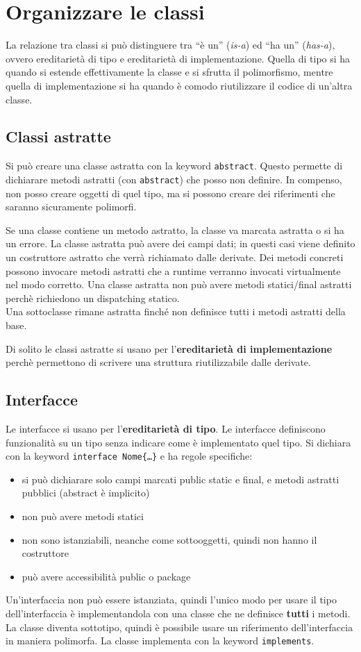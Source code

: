 \chapter{Organizzare le classi}

La relazione tra classi si può distinguere tra “è un” (\textit{is-a}) ed “ha un” (\textit{has-a}), ovvero ereditarietà di tipo e ereditarietà di implementazione. Quella di tipo si ha quando si estende effettivamente la classe e si sfrutta il polimorfismo, mentre quella di implementazione si ha quando è comodo riutilizzare il codice di un'altra classe.
\section{Classi astratte}
Si può creare una classe astratta con la keyword \texttt{abstract}. Questo permette di dichiarare metodi astratti (con \texttt{abstract}) che posso non definire. In compenso, non posso creare oggetti di quel tipo, ma si possono creare dei riferimenti che saranno sicuramente polimorfi.

Se una classe contiene un metodo astratto, la classe va marcata astratta o si ha un errore.
La classe astratta può avere dei campi dati; in questi casi viene definito un costruttore astratto che verrà richiamato dalle derivate.
Dei metodi concreti possono invocare metodi astratti che a runtime verranno invocati virtualmente nel modo corretto.
Una classe astratta non può avere metodi statici/final astratti perchè richiedono un dispatching statico. \\
Una sottoclasse rimane astratta finché non definisce tutti i metodi astratti della base.

Di solito le classi astratte si usano per l'\textbf{ereditarietà di implementazione} perchè permettono di scrivere una struttura riutilizzabile dalle derivate.

\section{Interfacce}
Le interfacce si usano per l'\textbf{ereditarietà di tipo}. Le interfacce definiscono funzionalità su un tipo senza indicare come è implementato quel tipo. Si dichiara con la keyword \texttt{interface Nome\{…\}} e ha regole specifiche:
\begin{itemize}
\item si può dichiarare solo campi marcati public static e final, e metodi astratti pubblici (abstract è implicito)
\item non può avere metodi statici
\item non sono istanziabili, neanche come sottooggetti, quindi non hanno il costruttore
\item può avere accessibilità public o package
\end{itemize}
Un'interfaccia non può essere istanziata, quindi l'unico modo per usare il tipo dell'interfaccia è implementandola con una classe che ne definisce \textbf{tutti} i metodi. La classe diventa sottotipo, quindi è possibile usare un riferimento dell'interfaccia in maniera polimorfa. La classe implementa con la keyword \texttt{implements}. 

